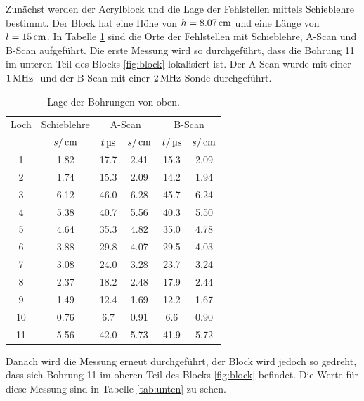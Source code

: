 Zunächst werden der Acrylblock und die Lage der Fehlstellen mittels Schieblehre
bestimmt. Der Block hat eine Höhe von $h=8.07\,\si{\centi\meter}$ und eine Länge von $l=15\,\si{\centi\meter}$.
In Tabelle \ref{tab:oben} sind die Orte der Fehlstellen mit Schieblehre, A-Scan
und B-Scan aufgeführt. Die erste Messung wird so durchgeführt, dass die Bohrung
11 im unteren Teil des Blocks \ref{fig:block} lokalisiert ist. Der A-Scan wurde
mit einer $1\,\si{\mega\hertz}$- und der B-Scan mit einer $2\,\si{\mega\hertz}$-Sonde durchgeführt.
\begin{table}[H]
  \centering
  \begin{tabular}{c|c|cc|cc}
    \toprule
    \multicolumn{1}{c|}{Loch}& \multicolumn{1}{c|}{Schieblehre} & \multicolumn{2}{c|}{A-Scan}
    & \multicolumn{2}{c}{B-Scan} \\
    & $s/\,\si{\centi\meter}$ & $t\,\si{\micro\second}$ & $s/\,\si{\centi\meter}$ & $t/\,\si{\micro\second}$ & $s/\,\si{\centi\meter}$ \\
    \midrule
     1  &  1.82 &  17.7 & 2.41 & 15.3 & 2.09 \\
     2  &  1.74 &  15.3 & 2.09 & 14.2 & 1.94 \\
     3  &  6.12 &  46.0 & 6.28 & 45.7 & 6.24 \\
     4  &  5.38 &  40.7 & 5.56 & 40.3 & 5.50 \\
     5  &  4.64 &  35.3 & 4.82 & 35.0 & 4.78 \\
     6  &  3.88 &  29.8 & 4.07 & 29.5 & 4.03 \\
     7  &  3.08 &  24.0 & 3.28 & 23.7 & 3.24 \\
     8  &  2.37 &  18.2 & 2.48 & 17.9 & 2.44 \\
     9  &  1.49 &  12.4 & 1.69 & 12.2 & 1.67 \\
    10  &  0.76 &   6.7 & 0.91 &  6.6 & 0.90 \\
    11  &  5.56 &  42.0 & 5.73 & 41.9 & 5.72 \\
    \bottomrule
  \end{tabular}
  \caption{Lage der Bohrungen von oben.}
  \label{tab:oben}
\end{table}
\noindent Danach wird die Messung erneut durchgeführt, der Block wird jedoch so gedreht,
dass sich Bohrung 11 im oberen Teil des Blocks \ref{fig:block} befindet.
Die Werte für diese Messung sind in Tabelle \ref{tab:unten} zu sehen.
